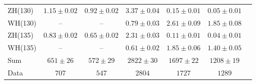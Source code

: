 \documentclass[12pt,twoside,a4paper,cmspaper,final,collab]{cms-tdr}
\begin{document}
\begin{table}[tbp]
\begin{center}
{\begin{tabular}{lcccccc}
ZH(130) & $1.15 \pm 0.02$ & $0.92 \pm 0.02$ & $3.37\pm 0.04$ &  $0.15 \pm 0.01$ &  $0.05 \pm 0.01$ \\
WH(130) & -- & -- & $0.79\pm 0.03$ & $2.61 \pm 0.09$ & $1.85 \pm 0.08$ \\
ZH(135) & $0.83 \pm 0.02$ &   $0.65 \pm 0.02$ & $2.31\pm 0.03$ &  $0.11 \pm 0.01$ &  $0.04 \pm 0.01$ \\
WH(135) & -- & -- & $0.61\pm 0.02$ & $1.85 \pm 0.06$ & $1.40 \pm 0.05$ \\
\hline
Sum &$651 \pm 26$& $572 \pm 29$ & $2822 \pm 30$ & $1697 \pm 22$ & $1208 \pm 19$ \\\hline
Data &  $707$ &  $547$ & $2804$ & $1727$ &$1289$  \\ \hline
\end{tabular}
}
\end{center}
\end{table}
\end{document}
